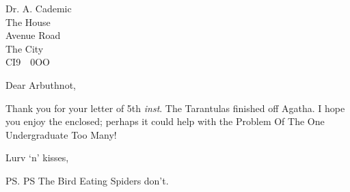 \documentclass[12pt,polychrome,thesuoy]{UoYletter}
\date{31 February 1944}
\begin{document}
\begin{letter}
        {Dr. A. Cademic\\The House\\Avenue Road\\The City\\CI9~~0OO}

\opening{Dear Arbuthnot,}


Thank you for your letter of 5th \emph{inst}.  The Tarantulas finished
off Agatha.  I hope you enjoy the enclosed; perhaps it could help with
the Problem Of The One Undergraduate Too Many!

\closing{Lurv `n' kisses,}

\ps{PS The Bird Eating Spiders don't.}

\end{letter}
\end{document}
